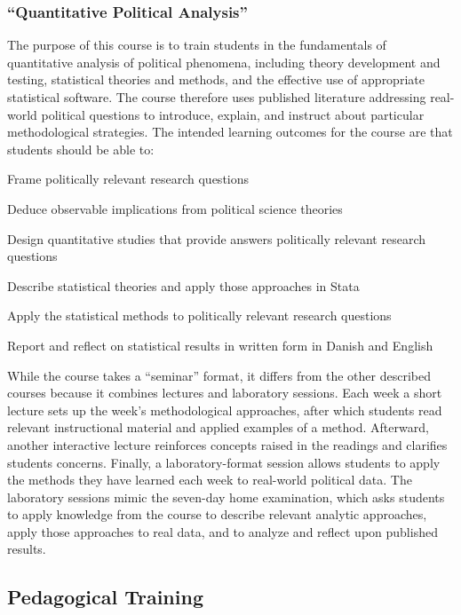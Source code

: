 \documentclass[12pt]{article}
\begin{document}
\subsubsection{``Quantitative Political Analysis''}

The purpose of this course is to train students in the fundamentals of quantitative analysis of political phenomena, including theory development and testing, statistical theories and methods, and the effective use of appropriate statistical software. The course therefore uses published literature addressing real-world political questions to introduce, explain, and instruct about particular methodological strategies. The intended learning outcomes for the course are that students should be able to:

\begin{enumerate*}
\item Frame politically relevant research questions 
\item Deduce observable implications from political science theories
\item Design quantitative studies that provide answers politically relevant research questions 
\item Describe statistical theories and apply those approaches in Stata
\item Apply the statistical methods to politically relevant research questions
\item Report and reflect on statistical results in written form in Danish and English
\end{enumerate*}

While the course takes a ``seminar'' format, it differs from the other described courses because it combines lectures and laboratory sessions. Each week a short lecture sets up the week's methodological approaches, after which students read relevant instructional material and applied examples of a method. Afterward, another interactive lecture reinforces concepts raised in the readings and clarifies students concerns. Finally, a laboratory-format session allows students to apply the methods they have learned each week to real-world political data. The laboratory sessions mimic the seven-day home examination, which asks students to apply knowledge from the course to describe relevant analytic approaches, apply those approaches to real data, and to analyze and reflect upon published results.


\clearpage
\subsection{Pedagogical Training}
\end{document}
